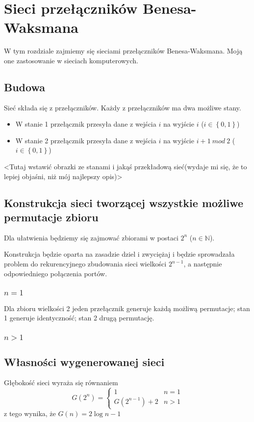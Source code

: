 \section{Sieci przełączników Benesa-Waksmana}

\label{sec:siecibenesa}

W tym rozdziale zajmiemy się sieciami przełączników Benesa-Waksmana. Moją one zastosowanie w sieciach komputerowych.

\subsection{Budowa}
Sieć składa się z przełączników.
Każdy z przełączników ma dwa możliwe stany.
\begin{itemize}
  \item W stanie 1 przełącznik przesyła dane z wejścia $i$ na wyjście $i$ ($i \in \left \{ 0, 1 \right \}$)
  \item W stanie 2 przełącznik przesyła dane z wejścia $i$ na wyjście $i + 1~mod~2$ ($i \in \left \{ 0, 1 \right \}$)
\end{itemize}
{\tiny<Tutaj wstawić obrazki ze stanami i jakąś przekładową sieć(wydaje mi się, że to lepiej objaśni, niż mój najlepszy opis)>}

\subsection{Konstrukcja sieci tworzącej wszystkie możliwe permutacje zbioru}
Dla ułatwienia będziemy się zajmować zbiorami w postaci $2^n$ ($n \in \mathbb{N}$).

Konstrukcja będzie oparta na zasadzie dziel i zwyciężaj i będzie sprowadzała problem do rekurencyjnego zbudowania sieci wielkości $2^{n-1}$,
a następnie odpowiedniego połączenia portów.
\subsubsection{$n = 1$}
Dla zbioru wielkości 2 jeden przełącznik generuje każdą możliwą permutacje; stan 1 generuje identyczność; stan 2 drugą permutację.
\subsubsection{$n > 1$}
{}
\subsection{Własności wygenerowanej sieci}
Głębokość sieci wyraża się równaniem
$$
 G(2^n) = 
  \begin{cases} 
   1 & n = 1 \\
   G(2^{n - 1}) + 2 & n > 1
  \end{cases}
$$
z tego wynika, że $G(n) = 2 \log n - 1$


